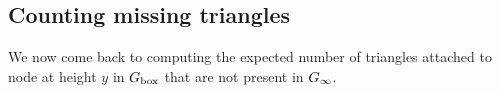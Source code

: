 

\subsection{Counting missing triangles}\label{ssec:missing_triangles}

We now come back to computing the expected number of triangles attached to node at height $y$ in $G_{\text{box}}$ that are not present in $G_{\infty}$. 

